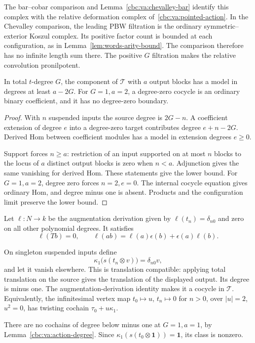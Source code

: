 The bar--cobar comparison and
Lemma~\ref{cbc:va:chevalley-bar} identify
this complex with the relative deformation complex
of~\eqref{cbc:va:pointed-action}. In the Chevalley
comparison, the leading PBW filtration is the ordinary
symmetric--exterior Koszul complex. Its positive
factor count is bounded at each configuration, as in
Lemma~\ref{lem:words-arity-bound}. The comparison
therefore has no infinite length sum there.
The positive $G$ filtration makes the relative
convolution pronilpotent.

\begin{lemma}\label{cbc:va:action-degree}
In total $t$-degree $G$, the component of $\mathcal T$
with $a$ output blocks has a model in degrees at least
$a-2G$. For $G=1,a=2$, a degree-zero cocycle is an
ordinary binary coefficient, and it has no degree-zero
boundary.
\end{lemma}
\begin{proof}
With $n$ suspended inputs the source degree is
$2G-n$. A coefficient extension of degree $e$ into
a degree-zero target contributes degree $e+n-2G$.
Derived Hom between coefficient modules has a model
in extension degrees $e\geq0$.

Support forces $n\geq a$: restriction of an input
supported on at most $n$ blocks to the locus of $a$
distinct output blocks is zero when $n<a$.
Adjunction gives the same vanishing for derived Hom.
These statements give the lower bound.
For $G=1,a=2$, degree zero forces $n=2,e=0$.
The internal cocycle equation gives ordinary Hom,
and degree minus one is absent.
Products and the configuration limit preserve the
lower bound.
\end{proof}

Let $\ell:N\to k$ be the augmentation derivation
given by $\ell(t_n)=\delta_{n0}$ and zero on all
other polynomial degrees. It satisfies
\[
 \ell(Tb)=0,\qquad
 \ell(ab)=\ell(a)\epsilon(b)+\epsilon(a)\ell(b).
\]

On singleton suspended inputs define
\[
 \kappa_1\bigl(s(t_n\otimes v)\bigr)=\delta_{n0}v,
\]
and let it vanish elsewhere.
This is translation compatible: applying total
translation on the source gives the translation of
the displayed output. Its degree is minus one.
The augmentation-derivation identity makes it a
cocycle in $\mathcal T$.
Equivalently, the infinitesimal vertex map
$t_0\mapsto u$, $t_n\mapsto0$ for $n>0$, over
$|u|=2$, $u^2=0$, has twisting cochain
$\tau_0+u\kappa_1$.

There are no cochains of degree below minus one at
$G=1,a=1$, by Lemma~\ref{cbc:va:action-degree}.
Since $\kappa_1(s(t_0\otimes\mathbf1))=\mathbf1$,
its class is nonzero.

